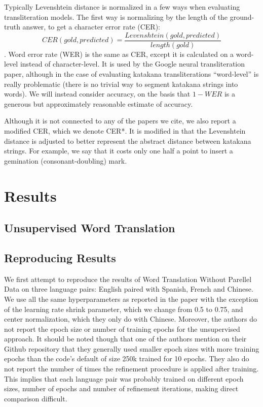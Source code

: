 \documentclass{article}
\begin{document}
Typically Levenshtein distance is normalized in a few ways
when evaluating transliteration models.
The first way is normalizing by the length of the ground-truth answer,
to get a character error rate (CER):
$$CER(gold, predicted) = \frac{Levenshtein(gold, predicted)}{length(gold)}$$.
Word error rate (WER) is the same as CER,
except it is calculated on a word-level instead of character-level.
It is used by the Google neural transliteration paper,
although in the case of evaluating katakana transliterations
``word-level'' is really problematic
(there is no trivial way to segment katakana strings into words).
We will instead consider accuracy,
on the basis that $1 - WER$
is a generous but approximately reasonable estimate of accuracy.

Although it is not connected to any of the papers we cite,
we also report a modified CER,
which we denote CER*.
It is modified in that the Levenshtein distance
is adjusted to better represent the abstract distance between katakana strings.
For example,
we say that it costs only one half a point
to insert a gemination (consonant-doubling) mark.

\section*{Results}

\subsection*{Unsupervised Word Translation}

\subsection*{Reproducing Results}

We first attempt to reproduce the results of Word Translation Without Parellel
Data on three language pairs: English paired with Spanish, French and Chinese.
We use all the same hyperparameters as reported in the paper with the exception
of the learning rate shrink parameter, which we change from 0.5 to 0.75, and
center normalization, which they only do with Chinese.
Moreover, the authors do not report the epoch size or number of training epochs
for the unsupervised approach. It should be noted though that one of the authors 
mention on their Github repository that they generally used smaller epoch sizes
with more training epochs than the code's default of size 250k trained for 10
epochs. They also do not report the number of times the refinement procedure
is applied after training. This implies that each language pair was probably
trained on different epoch sizes, number of epochs and number of refinement
iterations, making direct comparison difficult.
\end{document}

